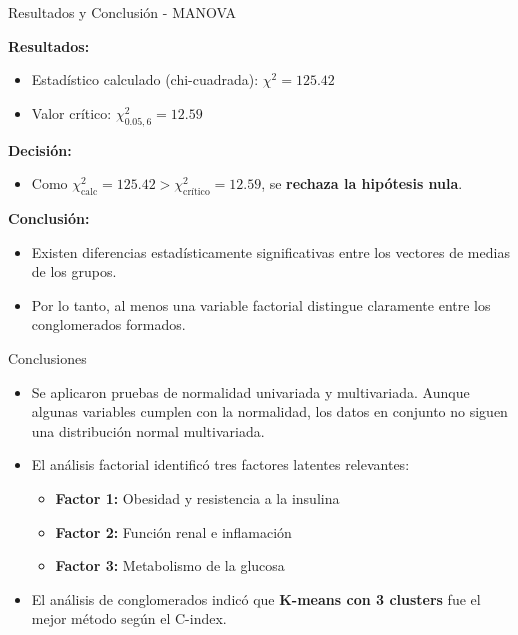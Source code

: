 \documentclass[
	11pt, %
]{beamer}
\begin{document}
\begin{frame}{Resultados y Conclusión - MANOVA}

\textbf{Resultados:}
\begin{itemize}
    \item Estadístico calculado (chi-cuadrada): $\chi^2 = 125.42$
    \item Valor crítico: $\chi^2_{0.05, 6} = 12.59$
\end{itemize}

\vspace{0.4cm}
\textbf{Decisión:}
\begin{itemize}
    \item Como $\chi^2_{\text{calc}} = 125.42 > \chi^2_{\text{crítico}} = 12.59$, se \textbf{rechaza la hipótesis nula}.
\end{itemize}

\vspace{0.4cm}
\textbf{Conclusión:}
\begin{itemize}
    \item Existen diferencias estadísticamente significativas entre los vectores de medias de los grupos.
    \item Por lo tanto, al menos una variable factorial distingue claramente entre los conglomerados formados.
\end{itemize}

\end{frame}
\begin{frame}{Conclusiones}

\begin{itemize}
    \item Se aplicaron pruebas de normalidad univariada y multivariada. Aunque algunas variables cumplen con la normalidad, los datos en conjunto no siguen una distribución normal multivariada.
    
    \item El análisis factorial identificó tres factores latentes relevantes:
    \begin{itemize}
        \item \textbf{Factor 1:} Obesidad y resistencia a la insulina
        \item \textbf{Factor 2:} Función renal e inflamación
        \item \textbf{Factor 3:} Metabolismo de la glucosa
    \end{itemize}

    \item El análisis de conglomerados indicó que \textbf{K-means con 3 clusters} fue el mejor método según el C-index.
\end{itemize}

\end{frame}
\end{document}
